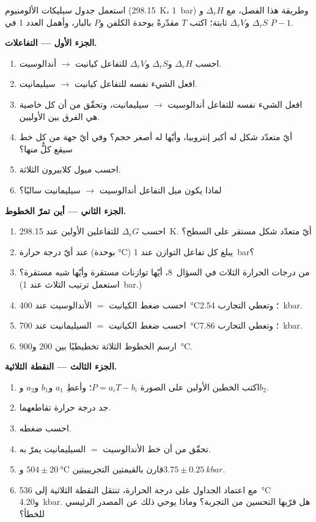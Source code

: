 \begin{problem}
\label{pb:b2:metamorphic-facies:1}
استعمل جدول سيليكات الألومنيوم (\qty{298.15}{K}، \qty{1}{bar}) وطريقة
هذا الفصل، مع $\Delta_r H$ و$\Delta_r S$ و$\Delta_r V$ ثابتة؛ اكتب $T$ مقدّرةً بوحدة
الكلفن و$P$ بالبار، وأهمل العدد 1 في $P - 1$.

\noindent\textbf{الجزء الأول --- التفاعلات.}
\begin{enumerate}
\item احسب $\Delta_r H$ و$\Delta_r S$ و$\Delta_r V$ للتفاعل كيانيت $\to$ أندالوسيت.
\item افعل الشيء نفسه للتفاعل كيانيت $\to$ سيليمانيت.
\item افعل الشيء نفسه للتفاعل أندالوسيت $\to$ سيليمانيت، وتحقّق من أن كل خاصية هي
الفرق بين الأوليين.
\item أيّ متعدّد شكل له أكبر إنتروبيا، وأيّها له أصغر حجم؟ وفي أيّ جهة
من كل خط سيقع كلٌّ منها؟
\item احسب ميول كلابيرون الثلاثة.
\item لماذا يكون ميل التفاعل أندالوسيت $\to$ سيليمانيت سالبًا؟
\end{enumerate}

\noindent\textbf{الجزء الثاني --- أين تمرّ الخطوط.}
\begin{enumerate}[resume]
\item احسب $\Delta_r G$ للتفاعلين الأولين عند \qty{298.15}{K}. أيّ
متعدّد شكل مستقر على السطح؟
\item عند أيّ درجة حرارة (بوحدة \unit{\celsius}) يبلغ كل تفاعل التوازن عند
\qty{1}{bar}؟
\item من درجات الحرارة الثلاث في السؤال~8، أيّها توازنات مستقرة وأيّها
شبه مستقرة؟ (استعمل ترتيب الثلاث عند \qty{1}{bar}.)
\item احسب ضغط الكيانيت $=$ الأندالوسيت عند \qty{400}{\celsius}؛
وتعطي التجارب \qty{2.54}{kbar}.
\item احسب ضغط الكيانيت $=$ السيليمانيت عند \qty{700}{\celsius}؛
وتعطي التجارب \qty{7.86}{kbar}.
\item ارسم الخطوط الثلاثة تخطيطيًا بين 200 و\qty{900}{\celsius}.
\end{enumerate}

\noindent\textbf{الجزء الثالث --- النقطة الثلاثية.}
\begin{enumerate}[resume]
\item اكتب الخطين الأولين على الصورة $P = a_i T - b_i$؛ وأعطِ $a_1$ و$b_1$ و$a_2$ و$b_2$.
\item جد درجة حرارة تقاطعهما.
\item احسب ضغطه.
\item تحقّق من أن خط الأندالوسيت $=$ السيليمانيت يمرّ به.
\item قارن بالقيمتين التجريبيتين $504 \pm \qty{20}{\celsius}$ و$3.75 \pm
\qty{0.25}{kbar}$.
\item مع اعتماد الجداول على درجة الحرارة، تنتقل النقطة الثلاثية إلى
\qty{536}{\celsius} و\qty{4.20}{kbar}. هل قرّبها التحسين من
التجربة؟ وماذا يوحي ذلك عن المصدر الرئيسي للخطأ؟
\end{enumerate}


\end{problem}
